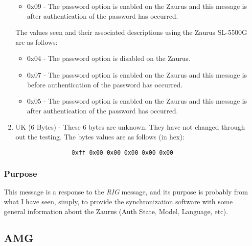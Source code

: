 \begin{enumerate}
\begin{itemize}
                \item 0x09 - The password option is enabled on the Zaurus and
                this message is after authentication of the password has
                occurred.
              \end{itemize}

              The values seen and their associated descriptions using the
              Zaurus SL-5500G are as follows:
              \begin{itemize}
                \item 0x04 - The password option is disabled on the Zaurus.

                \item 0x07 - The password option is enabled on the Zaurus and
                this message is before authentication of the password has
                occurred.

                \item 0x05 - The password option is enabled on the Zaurus and
                this message is after authentication of the password has
                occurred.
              \end{itemize}

              \item UK (6 Bytes) - These 6 bytes are unknown. They have not
              changed through out the testing. The bytes values are as
              follows (in hex):

              \begin{verbatim}
                0xff 0x00 0x00 0x00 0x00 0x00
              \end{verbatim}

            \end{enumerate}

            \subsubsection{Purpose}

            This message is a response to the \emph{RIG} message, and its
            purpose is probably from what I have seen, simply, to provide the
            synchronization software with some general information
            about the Zaurus (Auth State, Model, Language, etc).

        \subsection{AMG}

